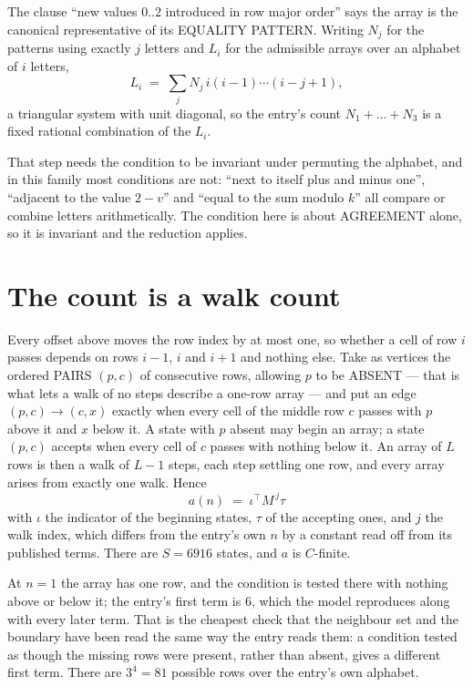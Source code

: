 \documentclass[11pt,a4paper]{article}
\theoremstyle{plain}
\theoremstyle{definition}
\begin{document}
The clause ``new values $0..2$ introduced in row major order'' says the array is the
canonical representative of its EQUALITY PATTERN. Writing $N_j$ for the patterns using exactly
$j$ letters and $L_i$ for the admissible arrays over an alphabet of $i$ letters,
\[
L_i\;=\;\sum_j N_j\,i(i-1)\cdots(i-j+1),
\]
a triangular system with unit diagonal, so the entry's count $N_1+\dots+N_{3}$ is a
fixed rational combination of the $L_i$.

That step needs the condition to be invariant under permuting the alphabet, and in this family
most conditions are not: ``next to itself plus and minus one'', ``adjacent to the value
$2-v$'' and ``equal to the sum modulo $k$'' all compare or combine letters arithmetically.
The condition here is about AGREEMENT alone, so it is invariant and the reduction applies.

\section{The count is a walk count}

Every offset above moves the row index by at most one, so whether a cell of row $i$ passes
depends on rows $i-1$, $i$ and $i+1$ and nothing else. Take as vertices the ordered PAIRS
$(p,c)$ of consecutive rows, allowing $p$ to be ABSENT --- that is what lets a walk of no steps
describe a one-row array --- and put an edge $(p,c)\to(c,x)$ exactly when every cell of the
middle row $c$ passes with $p$ above it and $x$ below it. A state with $p$ absent may begin an
array; a state $(p,c)$ accepts when every cell of $c$ passes with nothing below it. An array of
$L$ rows is then a walk of $L-1$ steps, each step settling one row, and every array arises from
exactly one walk. Hence
\[
a(n)\;=\;\iota^{\!\top}M^{\,j}\tau
\]
with $\iota$ the indicator of the beginning states, $\tau$ of the accepting ones, and $j$ the
walk index, which differs from the entry's own $n$ by a constant read off from its published
terms. There are $S=6916$ states, and $a$ is $C$-finite.

At $n=1$ the array has one row, and
the condition is tested there with nothing above or below it; the entry's first term is
$6$, which the model reproduces along with every later term. That is the cheapest check
that the neighbour set and the boundary have been read the same way the entry reads them: a
condition tested as though the missing rows were present, rather than absent, gives a different
first term. There are $3^{4}=81$ possible rows over the entry's own alphabet.
\end{document}
